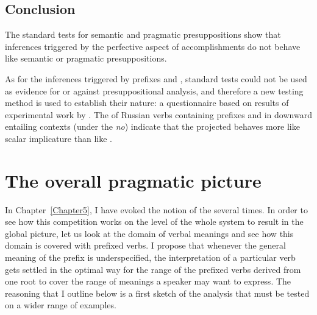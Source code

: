 \subsection{Conclusion}\largerpage
The standard tests for semantic and pragmatic presuppositions show that inferences triggered by the perfective aspect of accomplishments do not behave like semantic or pragmatic presuppositions.

As for the inferences triggered by prefixes  and , standard tests could not be used as evidence for or against presuppositional analysis, and therefore a new testing method is used to establish their nature: a questionnaire based on results of experimental work by \citet{Chemla:09}.
The  of Russian verbs containing prefixes  and  in downward entailing contexts (under the  \textit{no}) indicate that the projected  behaves more like scalar implicature than like .


\section{The overall pragmatic picture}\label{section:pragm:overall}
In Chapter~\ref{Chapter5}, I have evoked the notion of the  several times. In order to see how this competition works on the level of the whole  system to result in the global picture, let us look at the domain of verbal meanings and see how this domain is covered with prefixed verbs. I propose that whenever the general meaning of the prefix is underspecified, the interpretation of a particular verb gets settled in the optimal way for the range of the prefixed verbs derived from one root to cover the range of meanings a speaker may want to express. The reasoning that I outline below is a first sketch of the analysis that must be tested on a wider range of examples.

